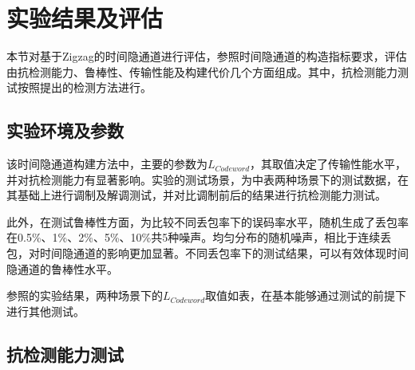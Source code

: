 \section{实验结果及评估}
\label{chap:zigzag:results}
本节对基于Zigzag的时间隐通道进行评估，参照时间隐通道的构造指标要求，评估由抗检测能力、鲁棒性、传输性能及构建代价几个方面组成。其中，抗检测能力测试按照提出的检测方法进行。

\subsection{实验环境及参数}
\label{chap:zigzag:results:environment}
该时间隐通道构建方法中，主要的参数为$L_{Codeword}$，其取值决定了传输性能水平，并对抗检测能力有显著影响。实验的测试场景，为中表两种场景下的测试数据，在其基础上进行调制及解调测试，并对比调制前后的结果进行抗检测能力测试。

此外，在测试鲁棒性方面，为比较不同丢包率下的误码率水平，随机生成了丢包率在0.5\%、1\%、2\%、5\%、10\%共5种噪声。均匀分布的随机噪声，相比于连续丢包，对时间隐通道的影响更加显著。不同丢包率下的测试结果，可以有效体现时间隐通道的鲁棒性水平。


参照的实验结果，两种场景下的$L_{Codeword}$取值如表，在基本能够通过测试的前提下进行其他测试。

\subsection{抗检测能力测试}
\label{chap:zigzag:results:undetectability}

